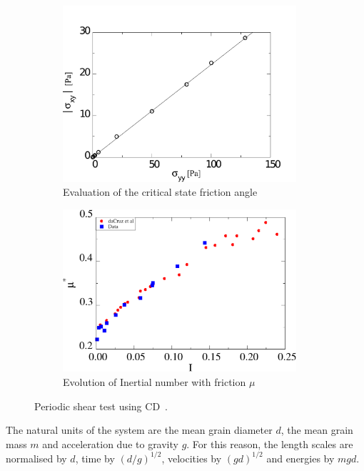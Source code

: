 \begin{figure}[tbhp]
\centering
\begin{subfigure}[t]{0.475\textwidth}
\includegraphics[width=0.95\textwidth]{Sxy_vs_Syy_Slope}
\caption{Evaluation of the critical state friction angle}
\label{fig:Sxy_vs_Syy_Slope}
\end{subfigure}
%
\begin{subfigure}[t]{0.475\textwidth}
\includegraphics[width=0.95\textwidth]{mu_vs_I}
\caption{Evolution of Inertial number with friction $\mu$}
\label{fig:mu_vs_I}
\end{subfigure}
\caption{Periodic shear test using CD~\citep{Mutabaruka2013}.}
\label{fig:Shear_Test_Slope}
\end{figure}

The natural units of the system 
are the mean grain diameter $d$, the mean grain 
mass $m$ and acceleration due to gravity $g$. For this reason, the length 
scales are normalised by $d$, time by $(d/g)^{1/2}$, velocities by $(gd)^{1/2}$ 
and energies by $mgd$. 


